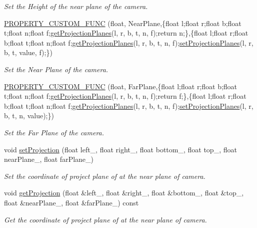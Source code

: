 \begin{DoxyCompactItemize}
\begin{DoxyCompactList}\small\item\em Set the Height of the near plane of the camera. \end{DoxyCompactList}\item 
\hyperlink{class_i_dream_sky_1_1_orthographic_camera_component_aac55eaa44e20c9e54f75968df0c755e5}{P\+R\+O\+P\+E\+R\+T\+Y\+\_\+\+C\+U\+S\+T\+O\+M\+\_\+\+F\+U\+NC} (float, Near\+Plane,\{float l;float r;float b;float t;float n;float f;\hyperlink{class_i_dream_sky_1_1_camera_component_af5d94dcadd4011e3a0dad972c8eadd9b}{get\+Projection\+Planes}(l, r, b, t, n, f);return n;\},\{float l;float r;float b;float t;float n;float f;\hyperlink{class_i_dream_sky_1_1_camera_component_af5d94dcadd4011e3a0dad972c8eadd9b}{get\+Projection\+Planes}(l, r, b, t, n, f);\hyperlink{class_i_dream_sky_1_1_camera_component_ab50fcc345c5beb14317b4bb74f6c2b2e}{set\+Projection\+Planes}(l, r, b, t, value, f);\})
\begin{DoxyCompactList}\small\item\em Set the Near Plane of the camera. \end{DoxyCompactList}\item 
\hyperlink{class_i_dream_sky_1_1_orthographic_camera_component_a7039070f8b15538743d5c646a4aa9921}{P\+R\+O\+P\+E\+R\+T\+Y\+\_\+\+C\+U\+S\+T\+O\+M\+\_\+\+F\+U\+NC} (float, Far\+Plane,\{float l;float r;float b;float t;float n;float f;\hyperlink{class_i_dream_sky_1_1_camera_component_af5d94dcadd4011e3a0dad972c8eadd9b}{get\+Projection\+Planes}(l, r, b, t, n, f);return f;\},\{float l;float r;float b;float t;float n;float f;\hyperlink{class_i_dream_sky_1_1_camera_component_af5d94dcadd4011e3a0dad972c8eadd9b}{get\+Projection\+Planes}(l, r, b, t, n, f);\hyperlink{class_i_dream_sky_1_1_camera_component_ab50fcc345c5beb14317b4bb74f6c2b2e}{set\+Projection\+Planes}(l, r, b, t, n, value);\})
\begin{DoxyCompactList}\small\item\em Set the Far Plane of the camera. \end{DoxyCompactList}\item 
void \hyperlink{class_i_dream_sky_1_1_orthographic_camera_component_a8e1270031c486ce7c92145b28c74c9fe}{set\+Projection} (float left\+\_\+, float right\+\_\+, float bottom\+\_\+, float top\+\_\+, float near\+Plane\+\_\+, float far\+Plane\+\_\+)
\begin{DoxyCompactList}\small\item\em Set the coordinate of project plane of at the near plane of camera. \end{DoxyCompactList}\item 
void \hyperlink{class_i_dream_sky_1_1_orthographic_camera_component_a0b65352cd50f14c0b801bb5ac427c1fd}{get\+Projection} (float \&left\+\_\+, float \&right\+\_\+, float \&bottom\+\_\+, float \&top\+\_\+, float \&near\+Plane\+\_\+, float \&far\+Plane\+\_\+) const 
\begin{DoxyCompactList}\small\item\em Get the coordinate of project plane of at the near plane of camera. \end{DoxyCompactList}\end{DoxyCompactItemize}
